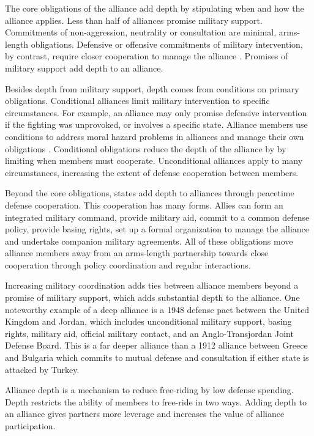 \documentclass[12pt]{article}
\begin{document}
The core obligations of the alliance add depth by stipulating when and how the alliance applies. 
Less than half of alliances promise military support. 
Commitments of non-aggression, neutrality or consultation are minimal, arms-length obligations. 
Defensive or offensive commitments of military intervention, by contrast, require closer cooperation to manage the alliance \citep{Snyder1997}. 
Promises of military support add depth to an alliance. 


Besides depth from military support, depth comes from conditions on primary obligations. 
Conditional alliances limit military intervention to specific circumstances. 
For example, an alliance may only promise defensive intervention if the fighting was unprovoked, or involves a specific state.  
Alliance members use conditions to address moral hazard problems in alliances \citep{Benson2012, Bensonetal2014} and manage their own obligations \citep{Chibaetal2015}. 
Conditional obligations reduce the depth of the alliance by by limiting when members must cooperate. 
Unconditional alliances apply to many circumstances, increasing the extent of defense cooperation between members.


Beyond the core obligations, states add depth to alliances through peacetime defense cooperation. 
This cooperation has many forms. 
Allies can form an integrated military command, provide military aid, commit to a common defense policy, provide basing rights, set up a formal organization to manage the alliance and undertake companion military agreements. 
All of these obligations move alliance members away from an arms-length partnership towards close cooperation through policy coordination and regular interactions. 


Increasing military coordination adds ties between alliance members beyond a promise of military support, which adds substantial depth to the alliance. 
One noteworthy example of a deep alliance is a 1948 defense pact between the United Kingdom and Jordan, which includes unconditional military support, basing rights, military aid, official military contact, and an Anglo-Transjordan Joint Defense Board.  
This is a far deeper alliance than a 1912 alliance between Greece and Bulgaria which commits to mutual defense and consultation if either state is attacked by Turkey. 


Alliance depth is a mechanism to reduce free-riding by low defense spending. 
Depth restricts the ability of members to free-ride in two ways. 
Adding depth to an alliance gives partners more leverage and increases the value of alliance participation. 
\end{document}
